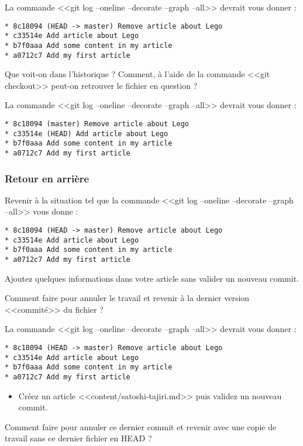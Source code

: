 \documentclass[a4paper]{article}
\begin{document}
La commande <<git log --oneline --decorate --graph --all>> devrait vous donner :
\begin{verbatim}
* 8c18094 (HEAD -> master) Remove article about Lego
* c33514e Add article about Lego
* b7f0aaa Add some content in my article
* a0712c7 Add my first article
\end{verbatim}

Que voit-on dans l'historique ?
Comment, à l'aide de la commande <<git checkout>> peut-on retrouver le fichier en question ?

La commande <<git log --oneline --decorate --graph --all>> devrait vous donner :
\begin{verbatim}
* 8c18094 (master) Remove article about Lego
* c33514e (HEAD) Add article about Lego
* b7f0aaa Add some content in my article
* a0712c7 Add my first article
\end{verbatim}

\subsubsection{Retour en arrière}

Revenir à la situation tel que la commande <<git log --oneline --decorate --graph --all>> vous donne :
\begin{verbatim}
* 8c18094 (HEAD -> master) Remove article about Lego
* c33514e Add article about Lego
* b7f0aaa Add some content in my article
* a0712c7 Add my first article
\end{verbatim}

Ajoutez quelques informations dans votre article sans valider un nouveau commit.

Comment faire pour annuler le travail et revenir à la dernier version <<commité>> du fichier ?

La commande <<git log --oneline --decorate --graph --all>> devrait vous donner :
\begin{verbatim}
* 8c18094 (HEAD -> master) Remove article about Lego
* c33514e Add article about Lego
* b7f0aaa Add some content in my article
* a0712c7 Add my first article
\end{verbatim}

\begin{itemize}
  \item Créez un article <<content/satoshi-tajiri.md>> puis validez un nouveau commit.
\end{itemize}

Comment faire pour annuler ce dernier commit et revenir avec une copie de travail sans ce dernier fichier en HEAD ?
\end{document}
